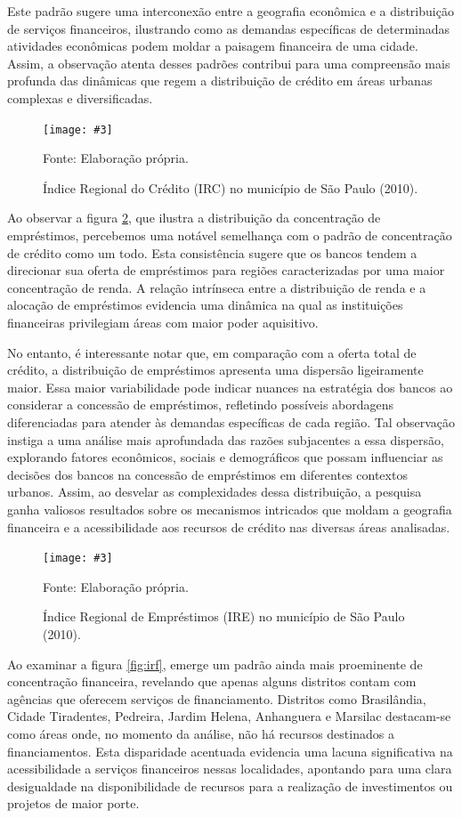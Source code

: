 \documentclass[a4paper,12pt]{article}
\newcommand{\fig}[4]{%
  \begin{figure}[H]
    \centering
    \caption{#1}
    \label{#2}
    \texttt{[image: \#3]}
    
    \vspace{0.5cm}
    
    \begin{footnotesize}
      Fonte: #4
    \end{footnotesize}
  \end{figure}
}
\begin{document}
Este padrão sugere uma interconexão entre a geografia econômica e a
distribuição de serviços financeiros, ilustrando como as demandas
específicas de determinadas atividades econômicas podem moldar a
paisagem financeira de uma cidade. Assim, a observação atenta desses
padrões contribui para uma compreensão mais profunda das dinâmicas que
regem a distribuição de crédito em áreas urbanas complexas e
diversificadas.

\fig{Índice Regional do Crédito (IRC) no município de São Paulo (2010).}{fig:irc}{exports/irc2.pdf}{Elaboração própria.}

Ao observar a figura \ref{fig:ire}, que ilustra a distribuição da
concentração de empréstimos, percebemos uma notável semelhança com o
padrão de concentração de crédito como um todo. Esta consistência sugere
que os bancos tendem a direcionar sua oferta de empréstimos para regiões
caracterizadas por uma maior concentração de renda. A relação intrínseca
entre a distribuição de renda e a alocação de empréstimos evidencia uma
dinâmica na qual as instituições financeiras privilegiam áreas com maior
poder aquisitivo.

No entanto, é interessante notar que, em comparação com a oferta total
de crédito, a distribuição de empréstimos apresenta uma dispersão
ligeiramente maior. Essa maior variabilidade pode indicar nuances na
estratégia dos bancos ao considerar a concessão de empréstimos,
refletindo possíveis abordagens diferenciadas para atender às demandas
específicas de cada região. Tal observação instiga a uma análise mais
aprofundada das razões subjacentes a essa dispersão, explorando fatores
econômicos, sociais e demográficos que possam influenciar as decisões
dos bancos na concessão de empréstimos em diferentes contextos urbanos.
Assim, ao desvelar as complexidades dessa distribuição, a pesquisa ganha
valiosos resultados sobre os mecanismos intricados que moldam a
geografia financeira e a acessibilidade aos recursos de crédito nas
diversas áreas analisadas.

\fig{Índice Regional de Empréstimos (IRE) no município de São Paulo (2010).}{fig:ire}{exports/ire2.pdf}{Elaboração própria.}

Ao examinar a figura \ref{fig:irf}, emerge um padrão ainda mais
proeminente de concentração financeira, revelando que apenas alguns
distritos contam com agências que oferecem serviços de financiamento.
Distritos como Brasilândia, Cidade Tiradentes, Pedreira, Jardim Helena,
Anhanguera e Marsilac destacam-se como áreas onde, no momento da
análise, não há recursos destinados a financiamentos. Esta disparidade
acentuada evidencia uma lacuna significativa na acessibilidade a
serviços financeiros nessas localidades, apontando para uma clara
desigualdade na disponibilidade de recursos para a realização de
investimentos ou projetos de maior porte.
\end{document}
